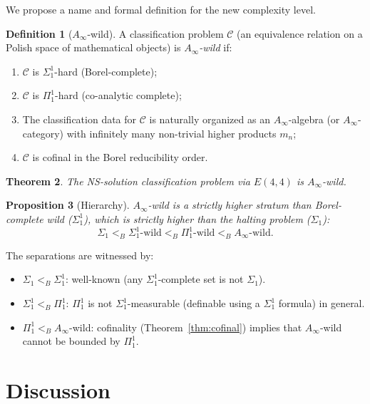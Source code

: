 \documentclass[reqno,10pt]{amsart}
\theoremstyle{plain}
\newtheorem{theorem}{Theorem}[section]
\newtheorem{proposition}[theorem]{Proposition}
\theoremstyle{definition}
\newtheorem{definition}[theorem]{Definition}
\def\gE{E(4,4)}
\begin{document}
We propose a name and formal definition for the new complexity level.

\begin{definition}[$A_\infty$-wild]\label{def:awild}
  A classification problem $\mathcal{C}$ (an equivalence relation on a
  Polish space of mathematical objects) is \emph{$A_\infty$-wild} if:
  \begin{enumerate}
    \item[\rm(i)] $\mathcal{C}$ is $\Sigma_1^1$-hard (Borel-complete);
    \item[\rm(ii)] $\mathcal{C}$ is $\Pi_1^1$-hard (co-analytic complete);
    \item[\rm(iii)] The classification data for $\mathcal{C}$ is naturally
          organized as an $A_\infty$-algebra (or $A_\infty$-category) with
          infinitely many non-trivial higher products $m_n$;
    \item[\rm(iv)] $\mathcal{C}$ is cofinal in the Borel reducibility order.
  \end{enumerate}
\end{definition}

\begin{theorem}
  The NS-solution classification problem via $\gE$ is $A_\infty$-wild.
\end{theorem}

\begin{proposition}[Hierarchy]
  $A_\infty$-wild is a strictly higher stratum than Borel-complete wild
  ($\Sigma_1^1$), which is strictly higher than the halting problem ($\Sigma_1$):
  \[
    \Sigma_1 <_B \Sigma_1^1\text{-wild} <_B \Pi_1^1\text{-wild}
    <_B A_\infty\text{-wild}.
  \]
\end{proposition}

The separations are witnessed by:
\begin{itemize}
  \item $\Sigma_1 <_B \Sigma_1^1$: well-known (any $\Sigma_1^1$-complete
        set is not $\Sigma_1$).
  \item $\Sigma_1^1 <_B \Pi_1^1$: $\Pi_1^1$ is not $\Sigma_1^1$-measurable
        (definable using a $\Sigma_1^1$ formula) in general.
  \item $\Pi_1^1 <_B A_\infty$-wild: cofinality (Theorem~\ref{thm:cofinal})
        implies that $A_\infty$-wild cannot be bounded by $\Pi_1^1$.
\end{itemize}

\section{Discussion}\label{sec:discussion}
\end{document}
